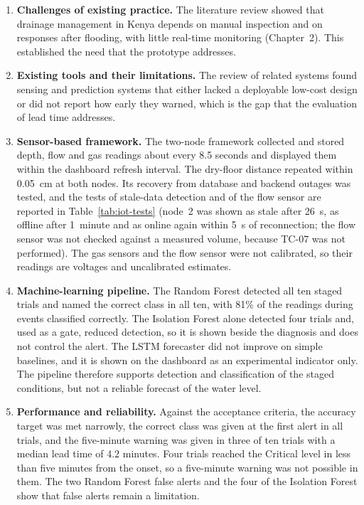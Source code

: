 \documentclass[12pt, a4paper]{article}
\begin{document}
\begin{enumerate}[label=\roman*.]
\item \textbf{Challenges of existing practice.} The literature review showed that drainage management in Kenya depends on manual inspection and on responses after flooding, with little real-time monitoring (Chapter~2). This established the need that the prototype addresses.
\item \textbf{Existing tools and their limitations.} The review of related systems found sensing and prediction systems that either lacked a deployable low-cost design or did not report how early they warned, which is the gap that the evaluation of lead time addresses.
\item \textbf{Sensor-based framework.} The two-node framework collected and stored depth, flow and gas readings about every 8.5 seconds and displayed them within the dashboard refresh interval. The dry-floor distance repeated within 0.05~cm at both nodes. Its recovery from database and backend outages was tested, and the tests of stale-data detection and of the flow sensor are reported in Table~\ref{tab:iot-tests} (node~2 was shown as stale after 26~s, as offline after 1~minute and as online again within 5~s of reconnection; the flow sensor was not checked against a measured volume, because TC-07 was not performed). The gas sensors and the flow sensor were not calibrated, so their readings are voltages and uncalibrated estimates.
\item \textbf{Machine-learning pipeline.} The Random Forest detected all ten staged trials and named the correct class in all ten, with 81\% of the readings during events classified correctly. The Isolation Forest alone detected four trials and, used as a gate, reduced detection, so it is shown beside the diagnosis and does not control the alert. The LSTM forecaster did not improve on simple baselines, and it is shown on the dashboard as an experimental indicator only. The pipeline therefore supports detection and classification of the staged conditions, but not a reliable forecast of the water level.
\item \textbf{Performance and reliability.} Against the acceptance criteria, the accuracy target was met narrowly, the correct class was given at the first alert in all trials, and the five-minute warning was given in three of ten trials with a median lead time of 4.2 minutes. Four trials reached the Critical level in less than five minutes from the onset, so a five-minute warning was not possible in them. The two Random Forest false alerts and the four of the Isolation Forest show that false alerts remain a limitation.
\end{enumerate}
\end{document}
